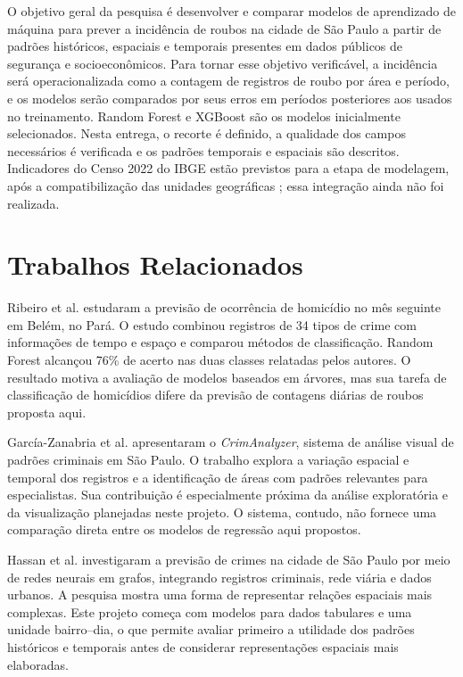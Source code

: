 \documentclass[12pt]{article}
\begin{document}
O objetivo geral da pesquisa é desenvolver e comparar modelos de aprendizado de máquina para prever a incidência de roubos na cidade de São Paulo a partir de padrões históricos, espaciais e temporais presentes em dados públicos de segurança e socioeconômicos. Para tornar esse objetivo verificável, a incidência será operacionalizada como a contagem de registros de roubo por área e período, e os modelos serão comparados por seus erros em períodos posteriores aos usados no treinamento. Random Forest e XGBoost são os modelos inicialmente selecionados. Nesta entrega, o recorte é definido, a qualidade dos campos necessários é verificada e os padrões temporais e espaciais são descritos. Indicadores do Censo 2022 do IBGE estão previstos para a etapa de modelagem, após a compatibilização das unidades geográficas \cite{ibge}; essa integração ainda não foi realizada.

\section{Trabalhos Relacionados}

Ribeiro et al. \cite{ribeiro2022} estudaram a previsão de ocorrência de homicídio no mês seguinte em Belém, no Pará. O estudo combinou registros de 34 tipos de crime com informações de tempo e espaço e comparou métodos de classificação. Random Forest alcançou 76\% de acerto nas duas classes relatadas pelos autores. O resultado motiva a avaliação de modelos baseados em árvores, mas sua tarefa de classificação de homicídios difere da previsão de contagens diárias de roubos proposta aqui.

García-Zanabria et al. \cite{crimanalyzer} apresentaram o \textit{CrimAnalyzer}, sistema de análise visual de padrões criminais em São Paulo. O trabalho explora a variação espacial e temporal dos registros e a identificação de áreas com padrões relevantes para especialistas. Sua contribuição é especialmente próxima da análise exploratória e da visualização planejadas neste projeto. O sistema, contudo, não fornece uma comparação direta entre os modelos de regressão aqui propostos.

Hassan et al. \cite{hassan2024} investigaram a previsão de crimes na cidade de São Paulo por meio de redes neurais em grafos, integrando registros criminais, rede viária e dados urbanos. A pesquisa mostra uma forma de representar relações espaciais mais complexas. Este projeto começa com modelos para dados tabulares e uma unidade bairro--dia, o que permite avaliar primeiro a utilidade dos padrões históricos e temporais antes de considerar representações espaciais mais elaboradas.
\end{document}
